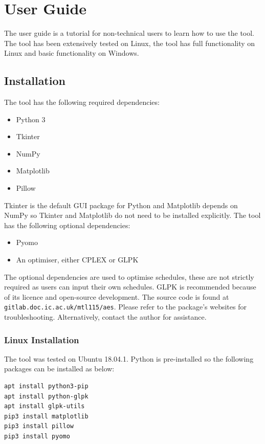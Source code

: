 \chapter{User Guide}

The user guide is a tutorial for non-technical users to learn how to use the tool. The tool has been extensively tested on Linux, the tool has full functionality on Linux and basic functionality on Windows.

\section{Installation}

The tool has the following required dependencies:

\begin{itemize}
	\item Python 3
	\item Tkinter
	\item NumPy
	\item Matplotlib
	\item Pillow
\end{itemize}

Tkinter is the default GUI package for Python and Matplotlib depends on NumPy so Tkinter and Matplotlib do not need to be installed explicitly. The tool has the following optional dependencies:

\begin{itemize}
	\item Pyomo
	\item An optimiser, either CPLEX or GLPK
\end{itemize}

The optional dependencies are used to optimise schedules, these are not strictly required as users can input their own schedules. GLPK is recommended because of its licence and open-source development. The source code is found at \texttt{gitlab.doc.ic.ac.uk/mtl115/aes}. Please refer to the package's websites for troubleshooting. Alternatively, contact the author for assistance.

\subsection{Linux Installation}

The tool was tested on Ubuntu 18.04.1. Python is pre-installed so the following packages can be installed as below:
\begin{verbatim}
apt install python3-pip
apt install python-glpk
apt install glpk-utils
pip3 install matplotlib
pip3 install pillow
pip3 install pyomo
\end{verbatim}

